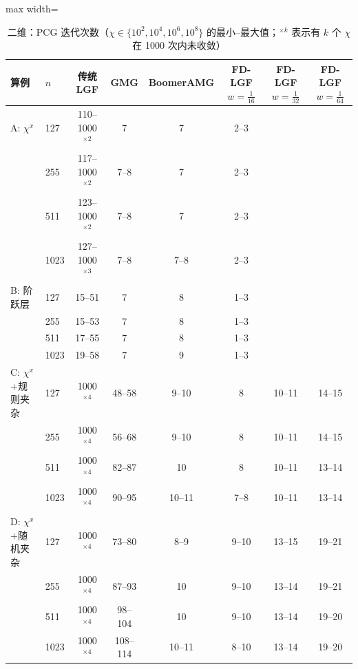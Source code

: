 \begin{table}[H]\centering\small
\caption{二维：PCG 迭代次数（$\chi\in\{10^2,10^4,10^6,10^8\}$ 的最小--最大值；$^{\times k}$ 表示有 $k$ 个 $\chi$ 在 1000 次内未收敛）}\label{tab:its2d}
\begin{adjustbox}{max width=\textwidth}
\begin{tabular}{llcccccc}
\toprule
算例 & $n$ & 传统 LGF & GMG & BoomerAMG & FD-LGF $w{=}\frac1{16}$ & FD-LGF $w{=}\frac1{32}$ & FD-LGF $w{=}\frac1{64}$ \\
\midrule
A: $\chi^x$ & 127 & 110--1000$^{\times2}$ & 7 & 7 & 2--3 &  &  \\
 & 255 & 117--1000$^{\times2}$ & 7--8 & 7 & 2--3 &  &  \\
 & 511 & 123--1000$^{\times2}$ & 7--8 & 7 & 2--3 &  &  \\
 & 1023 & 127--1000$^{\times3}$ & 7--8 & 7--8 & 2--3 &  &  \\
\midrule
B: 阶跃层 & 127 & 15--51 & 7 & 8 & 1--3 &  &  \\
 & 255 & 15--53 & 7 & 8 & 1--3 &  &  \\
 & 511 & 17--55 & 7 & 8 & 1--3 &  &  \\
 & 1023 & 19--58 & 7 & 9 & 1--3 &  &  \\
\midrule
C: $\chi^x$+规则夹杂 & 127 & 1000$^{\times4}$ & 48--58 & 9--10 & 8 & 10--11 & 14--15 \\
 & 255 & 1000$^{\times4}$ & 56--68 & 9--10 & 8 & 10--11 & 14--15 \\
 & 511 & 1000$^{\times4}$ & 82--87 & 10 & 8 & 10--11 & 13--14 \\
 & 1023 & 1000$^{\times4}$ & 90--95 & 10--11 & 7--8 & 10--11 & 13--14 \\
\midrule
D: $\chi^x$+随机夹杂 & 127 & 1000$^{\times4}$ & 73--80 & 8--9 & 9--10 & 13--15 & 19--21 \\
 & 255 & 1000$^{\times4}$ & 87--93 & 10 & 9--10 & 13--14 & 19--21 \\
 & 511 & 1000$^{\times4}$ & 98--104 & 10 & 9--10 & 13--14 & 19--20 \\
 & 1023 & 1000$^{\times4}$ & 108--114 & 10--11 & 8--10 & 13--14 & 19--20 \\
\bottomrule
\end{tabular}
\end{adjustbox}
\end{table}

